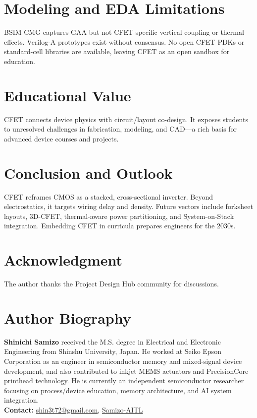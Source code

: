 \documentclass[conference]{IEEEtran}
\begin{document}
\section{Modeling and EDA Limitations}
BSIM-CMG captures GAA but not CFET-specific vertical coupling or thermal effects.
Verilog-A prototypes exist without consensus.
No open CFET PDKs or standard-cell libraries are available, leaving CFET as an open sandbox for education.\nocite{*}

\section{Educational Value}
CFET connects device physics with circuit/layout co-design.
It exposes students to unresolved challenges in fabrication, modeling, and CAD—a rich basis for advanced device courses and projects.

\section{Conclusion and Outlook}
CFET reframes CMOS as a stacked, cross-sectional inverter.
Beyond electrostatics, it targets wiring delay and density.
Future vectors include forksheet layouts, 3D-CFET, thermal-aware power partitioning, and System-on-Stack integration.
Embedding CFET in curricula prepares engineers for the 2030s.

\section*{Acknowledgment}
The author thanks the Project Design Hub community for discussions.




\section*{Author Biography}
\noindent\textbf{Shinichi Samizo}
received the M.S. degree in Electrical and Electronic Engineering from Shinshu University, Japan.
He worked at Seiko Epson Corporation as an engineer in semiconductor memory and mixed-signal device development, and also contributed to inkjet MEMS actuators and PrecisionCore printhead technology.
He is currently an independent semiconductor researcher focusing on process/device education, memory architecture, and AI system integration.\\[2pt]
\textbf{Contact:} \href{mailto:shin3t72@gmail.com}{shin3t72@gmail.com}, \href{https://github.com/Samizo-AITL}{Samizo-AITL}
\end{document}
